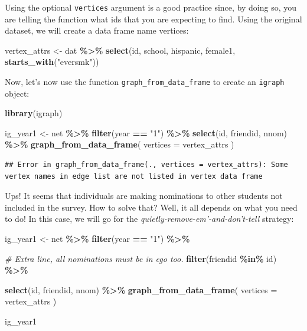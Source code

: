 \documentclass[
]{book}
\newenvironment{Shaded}{\begin{snugshade}}{\end{snugshade}}
\newcommand{\AttributeTok}[1]{\textcolor[rgb]{0.13,0.29,0.53}{#1}}
\newcommand{\CommentTok}[1]{\textcolor[rgb]{0.56,0.35,0.01}{\textit{#1}}}
\newcommand{\FunctionTok}[1]{\textcolor[rgb]{0.13,0.29,0.53}{\textbf{#1}}}
\newcommand{\NormalTok}[1]{#1}
\newcommand{\OtherTok}[1]{\textcolor[rgb]{0.56,0.35,0.01}{#1}}
\newcommand{\SpecialCharTok}[1]{\textcolor[rgb]{0.81,0.36,0.00}{\textbf{#1}}}
\newcommand{\StringTok}[1]{\textcolor[rgb]{0.31,0.60,0.02}{#1}}
\begin{document}
Using the optional \texttt{vertices} argument is a good practice since, by doing so, you are telling the function what ids that you are expecting to find. Using the original dataset, we will create a data frame name vertices:

\begin{Shaded}
\begin{Highlighting}[]
\NormalTok{vertex\_attrs }\OtherTok{\textless{}{-}}\NormalTok{ dat }\SpecialCharTok{\%\textgreater{}\%} 
  \FunctionTok{select}\NormalTok{(id, school, hispanic, female1, }\FunctionTok{starts\_with}\NormalTok{(}\StringTok{"eversmk"}\NormalTok{))}
\end{Highlighting}
\end{Shaded}

Now, let's now use the function \texttt{graph\_from\_data\_frame} to create an \texttt{igraph} object:

\begin{Shaded}
\begin{Highlighting}[]
\FunctionTok{library}\NormalTok{(igraph)}

\NormalTok{ig\_year1 }\OtherTok{\textless{}{-}}\NormalTok{ net }\SpecialCharTok{\%\textgreater{}\%}
  \FunctionTok{filter}\NormalTok{(year }\SpecialCharTok{==} \StringTok{"1"}\NormalTok{) }\SpecialCharTok{\%\textgreater{}\%} 
  \FunctionTok{select}\NormalTok{(id, friendid, nnom) }\SpecialCharTok{\%\textgreater{}\%}
  \FunctionTok{graph\_from\_data\_frame}\NormalTok{(}
    \AttributeTok{vertices =}\NormalTok{ vertex\_attrs}
\NormalTok{  )}
\end{Highlighting}
\end{Shaded}

\begin{verbatim}
## Error in graph_from_data_frame(., vertices = vertex_attrs): Some vertex names in edge list are not listed in vertex data frame
\end{verbatim}

Ups! It seems that individuals are making nominations to other students not included in the survey. How to solve that? Well, it all depends on what you need to do! In this case, we will go for the \emph{quietly-remove-em'-and-don't-tell} strategy:

\begin{Shaded}
\begin{Highlighting}[]
\NormalTok{ig\_year1 }\OtherTok{\textless{}{-}}\NormalTok{ net }\SpecialCharTok{\%\textgreater{}\%}
  \FunctionTok{filter}\NormalTok{(year }\SpecialCharTok{==} \StringTok{"1"}\NormalTok{) }\SpecialCharTok{\%\textgreater{}\%}
  
  \CommentTok{\# Extra line, all nominations must be in ego too.}
  \FunctionTok{filter}\NormalTok{(friendid }\SpecialCharTok{\%in\%}\NormalTok{ id) }\SpecialCharTok{\%\textgreater{}\%} 
  
  \FunctionTok{select}\NormalTok{(id, friendid, nnom) }\SpecialCharTok{\%\textgreater{}\%}
  \FunctionTok{graph\_from\_data\_frame}\NormalTok{(}
    \AttributeTok{vertices =}\NormalTok{ vertex\_attrs}
\NormalTok{    )}

\NormalTok{ig\_year1}
\end{Highlighting}
\end{Shaded}
\end{document}
